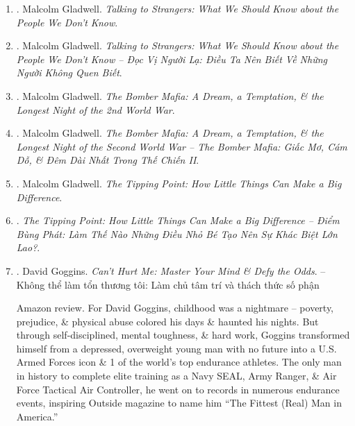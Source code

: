 \documentclass{article}
\begin{document}
\begin{enumerate}
	\item \cite{Gladwell2019}. Malcolm Gladwell. {\it Talking to Strangers: What We Should Know about the People We Don't Know}.\hfill{\sf[reading]}
	
	\item \cite{Gladwell_stranger}. Malcolm Gladwell. {\it Talking to Strangers: What We Should Know about the People We Don't Know -- Đọc Vị Người Lạ: Điều Ta Nên Biết Về Những Người Không Quen Biết}.\hfill{\sf[done]}
	
	\item \cite{Gladwell2021}. Malcolm Gladwell. {\it The Bomber Mafia: A Dream, a Temptation, \& the Longest Night of the 2nd World War}.\hfill{\sf[reading]}
	
	\item \cite{Gladwell_bomber_mafia}. Malcolm Gladwell. {\it The Bomber Mafia: A Dream, a Temptation, \& the Longest Night of the Second World War -- The Bomber Mafia: Giấc Mơ, Cám Dỗ, \& Đêm Dài Nhất Trong Thế Chiến II}.\hfill{\sf[done]}
	
	\item \cite{Gladwell2022}. Malcolm Gladwell. {\it The Tipping Point: How Little Things Can Make a Big Difference}.\hfill{\sf[reading]}
	
	\item \cite{Gladwell_tipping_point}. {\it The Tipping Point: How Little Things Can Make a Big Difference -- Điểm Bùng Phát: Làm Thế Nào Những Điều Nhỏ Bé Tạo Nên Sự Khác Biệt Lớn Lao?}.\hfill{\sf[done]}
	
	\item \cite{Goggins_hurt}. {\sc David Goggins}. {\it Can't Hurt Me: Master Your Mind \& Defy the Odds}. -- Không thể làm tổn thương tôi: Làm chủ tâm trí và thách thức số phận {}
	
	{\sf Amazon review.} For {\sc David Goggins}, childhood was a nightmare -- poverty, prejudice, \& physical abuse colored his days \& haunted his nights. But through self-disciplined, mental toughness, \& hard work, {\sc Goggins} transformed himself from a depressed, overweight young man with no future into a U.S. Armed Forces icon \& 1 of the world's top endurance athletes. The only man in history to complete elite training as a Navy SEAL, Army Ranger, \& Air Force Tactical Air Controller, he went on to records in numerous endurance events, inspiring Outside magazine to name him ``The Fittest (Real) Man in America.''
	

\end{enumerate}
\end{document}
